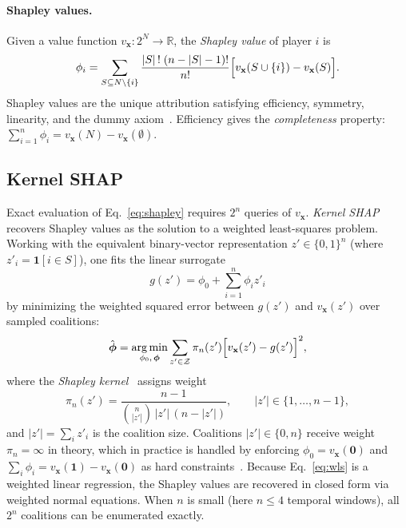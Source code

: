 \paragraph{Shapley values.}
Given a value function $v_\mathbf{x} : 2^N \to \mathbb{R}$, the
\emph{Shapley value} of player $i$ is~\citep{shapley1953value}
\begin{equation}
  \phi_i
  = \sum_{S \subseteq N \setminus \{i\}}
    \frac{|S|\,!\;(n - |S| - 1)!}{n!}
    \Bigl[v_\mathbf{x}(S \cup \{i\}) - v_\mathbf{x}(S)\Bigr].
  \label{eq:shapley}
\end{equation}
Shapley values are the unique attribution satisfying efficiency, symmetry, linearity, and the dummy axiom~\citep{shapley1953value}. Efficiency gives the \emph{completeness} property:
$\sum_{i=1}^n \phi_i = v_\mathbf{x}(N) - v_\mathbf{x}(\emptyset)$.

\subsection{Kernel SHAP}
\label{sec:kernelshap}

Exact evaluation of Eq.~\eqref{eq:shapley} requires $2^n$ queries of $v_\mathbf{x}$. \emph{Kernel SHAP}~\citep{lundberg2017unified} recovers Shapley values as the solution to a weighted least-squares problem. Working with the equivalent binary-vector representation $z' \in \{0,1\}^n$ (where $z'_i = \mathbf{1}[i \in S]$), one fits the linear surrogate
\begin{equation}
  g(z') = \phi_0 + \sum_{i=1}^{n} \phi_i z'_i
  \label{eq:surrogate}
\end{equation}
by minimizing the weighted squared error between $g(z')$ and $v_\mathbf{x}(z')$ over sampled coalitions:
\begin{equation}
  \hat{\boldsymbol{\phi}}
  = \underset{\phi_0,\,\boldsymbol{\phi}}{\arg\min}
  \sum_{z' \in \mathcal{Z}}
  \pi_n(z')
  \Bigl[v_\mathbf{x}(z') - g(z')\Bigr]^2,
  \label{eq:wls}
\end{equation}
where the \emph{Shapley kernel}~\citep{lundberg2017unified} assigns weight
\begin{equation}
  \pi_n(z')
  = \frac{n - 1}{\displaystyle\binom{n}{|z'|}\,|z'|\,(n - |z'|)},
  \qquad |z'| \in \{1, \ldots, n-1\},
  \label{eq:kernel}
\end{equation}
and $|z'| = \sum_i z'_i$ is the coalition size.
Coalitions $|z'| \in \{0, n\}$ receive weight $\pi_n = \infty$ in theory, which in practice is handled by enforcing $\phi_0 = v_\mathbf{x}(\mathbf{0})$ and $\sum_i \phi_i = v_\mathbf{x}(\mathbf{1}) - v_\mathbf{x}(\mathbf{0})$ as hard constraints~\citep{lundberg2017unified}. Because Eq.~\eqref{eq:wls} is a weighted linear regression, the Shapley
values are recovered in closed form via weighted normal equations. When $n$ is small (here $n \le 4$ temporal windows), all $2^n$ coalitions can be enumerated exactly.

